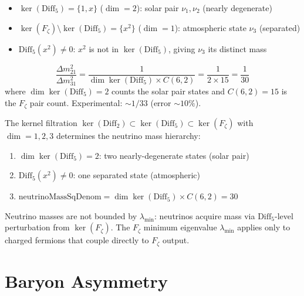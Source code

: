 \begin{itemize}
\item $\ker(\mathrm{Diff}_5) = \{1, x\}$ ($\dim = 2$): solar pair $\nu_1, \nu_2$ (nearly degenerate)
\item $\ker(F_\zeta) \setminus \ker(\mathrm{Diff}_5) = \{x^2\}$ ($\dim = 1$): atmospheric state $\nu_3$ (separated)
\item $\mathrm{Diff}_5(x^2) \neq 0$: $x^2$ is not in $\ker(\mathrm{Diff}_5)$, giving $\nu_3$ its distinct mass
\end{itemize}

\begin{theorem}
\label{thm:mass_neutrino}
\leanok
\[
\frac{\Delta m^2_{21}}{\Delta m^2_{31}} = \frac{1}{\dim\ker(\mathrm{Diff}_5) \times C(6,2)} = \frac{1}{2 \times 15} = \frac{1}{30}
\]
where $\dim\ker(\mathrm{Diff}_5) = 2$ counts the solar pair states and $C(6,2) = 15$ is the $F_\zeta$ pair count.
Experimental: $\sim 1/33$ (error $\sim 10\%$).
\end{theorem}

\begin{theorem}
\label{thm:mass_neutrino_hierarchy}
\leanok
The kernel filtration $\ker(\mathrm{Diff}_2) \subset \ker(\mathrm{Diff}_5) \subset \ker(F_\zeta)$ with $\dim = 1, 2, 3$
determines the neutrino mass hierarchy:
\begin{enumerate}
\item $\dim\ker(\mathrm{Diff}_5) = 2$: two nearly-degenerate states (solar pair)
\item $\mathrm{Diff}_5(x^2) \neq 0$: one separated state (atmospheric)
\item $\text{neutrinoMassSqDenom} = \dim\ker(\mathrm{Diff}_5) \times C(6,2) = 30$
\end{enumerate}
\end{theorem}

Neutrino masses are not bounded by $\lambda_{\min}$: neutrinos acquire mass via $\mathrm{Diff}_5$-level perturbation from $\ker(F_\zeta)$. The $F_\zeta$ minimum eigenvalue $\lambda_{\min}$ applies only to charged fermions that couple directly to $F_\zeta$ output.

\section{Baryon Asymmetry}
\label{sec:mass_baryon}

